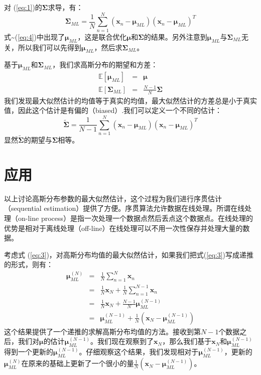 \documentclass[10pt,a4paper,UTF8]{article}
\begin{document}
对 (\ref{eq:1})的\(\mathbf{\Sigma}\)求导，有：
\begin{equation}
\label{eq:4}
\mathbf{\Sigma}_{ML} = \frac{1}{N} \sum_{n=1}^{N} (\mathbf{x}_{n}- \mathbf{\mu}_{ML})(\mathbf{x}_{n} - \mathbf{\mu}_{ML})^{T}
\end{equation}
式\textasciitilde{}(\ref{eq:4})中出现了\(\mathbf{\mu}_{ML}\)，这是联合优化\(\mathbf{\mu}\)和\(\mathbf{\Sigma}\)的结果。另外注意到\(\mathbf{\mu}_{ML}\)与\(\mathbf{\Sigma}_{ML}\)无关，所以我们可以先得到\(\mathbf{\mu}_{ML}\)，然后求\(\mathbf{\Sigma}_{ML}\)。

基于\(\mathbf{\mu}_{ML}\)和\(\mathbf{\Sigma}_{ML}\)，我们求高斯分布的期望和方差：
\begin{eqnarray}
\label{eq:5}
\mathbb{E}[\mathbf{\mu}_{ML}]&=& \mathbf{\mu} \\
\mathbb{E}[\mathbf{\Sigma}_{ML}]&=& \frac{N-1}{N} \mathbf{\Sigma}
\end{eqnarray}
我们发现最大似然估计的均值等于真实的均值，最大似然估计的方差总是小于真实值，因此这个估计是有偏的（biased）.我们可以定义一个不同的估计：
\begin{equation}
\label{eq:6}
\tilde{\mathbf{\Sigma}} = \frac{1}{N-1} \sum_{n=1}^{N} (\mathbf{x}_{n}- \mathbf{\mu}_{ML})(\mathbf{x}_{n} - \mathbf{\mu}_{ML})^{T}
\end{equation}
显然\(\tilde{\mathbf{\Sigma}}\)的期望与\(\mathbf{\Sigma}\)相等。
\section{应用}
\label{sec:orgfa12889}


以上讨论高斯分布参数的最大似然估计，这个过程为我们进行序贯估计（sequential estimation）提供了方便。序贯算法允许数据在线处理。所谓在线处理（on-line process）是指一次处理一个数据点然后丢点这个数据点。在线处理的优势是相对于离线处理（off-line）在线处理可以不用一次性保存并处理大量的数据。

考虑式 (\ref{eq:3})，对高斯分布均值的最大似然估计，如果我们把式(\ref{eq:3})写成递推的形式，则有：
\begin{eqnarray}
\label{eq:7}
\mathbf{\mu}_{ML}^{(N)}&=& \frac{1}{N}\sum_{n=1}^{N}\mathbf{x}_{n} \\
&=& \frac{1}{N}\mathbf{x}_{N} + \frac{1}{N}\sum_{n=1}^{N-1}\mathbf{x}_{n}\\
&=& \frac{1}{N}\mathbf{x}_{N} + \frac{N-1}{N} \mathbf{\mu}_{ML}^{(N-1)} \\
&=& \mathbf{\mu}_{ML}^{(N-1)} + \frac{1}{N}(\mathbf{x}_{N} - \mathbf{\mu}_{ML}^{(N-1)})
\end{eqnarray}
这个结果提供了一个递推的求解高斯分布均值的方法。接收到第\(N-1\)个数据之后，我们对\(\mathbf{\mu}\)的估计\(\mathbf{\mu}_{ML}^{(N-1)}\)。我们现在观察到了\(\mathbf{x}_{N}\)，那么我们基于\(\mathbf{x}_{N}\)和\(\mathbf{\mu}_{ML}^{(N-1)}\)得到一个更新的\(\mathbf{\mu}_{ML}^{(N-1)}\)。仔细观察这个结果，我们发现相对于\(\mathbf{\mu}_{ML}^{(N-1)}\)，更新的\(\mathbf{\mu}_{ML}^{(N)}\)在原来的基础上更新了一个很小的量\(\frac{1}{N}(\mathbf{x}_{N} - \mathbf{\mu}_{ML}^{(N-1)})\)。
\end{document}
